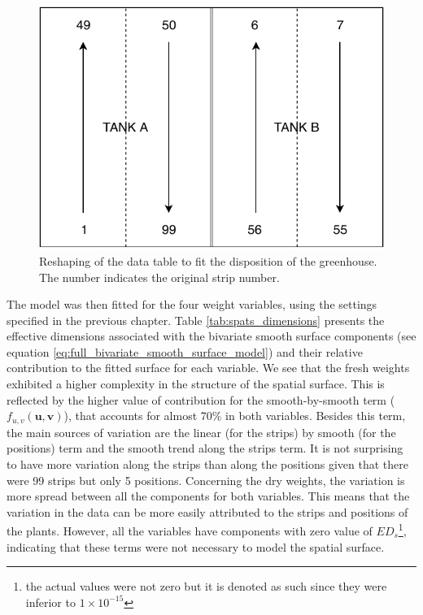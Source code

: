 \begin{figure}[hbtp]
	\centering
	\includegraphics[scale = 0.7]{figures/TANK_repartition.pdf}
	\caption[Reshaping of the data table to fit the disposition of the greenhouse]{Reshaping of the data table to fit the 
	disposition of the greenhouse. The number indicates the original strip number.}
	\label{fig:tank_disposition}	
\end{figure}

The model was then fitted for the four weight variables, using the settings specified in the previous chapter. Table \ref{tab:spats_dimensions} presents the effective dimensions associated with the bivariate smooth surface components (see equation \ref{eq:full_bivariate_smooth_surface_model}) 
and their relative contribution to the fitted surface for each variable.
We see that the fresh weights exhibited a higher complexity in the structure of the spatial surface. This is reflected by the higher value of contribution for the smooth-by-smooth term ($f_{u, v}(\boldsymbol{u}, \boldsymbol{v})$), that accounts for almost 70\% in both variables. Besides this term, the main sources of variation are the linear (for the strips) by smooth (for the positions) term and the smooth trend along the strips term. It is not surprising to have more variation along the strips than along the positions given that there were 99 strips but only 5 positions.
Concerning the dry weights, the variation is more spread between all the components for both variables. This means that the variation in the data can be more easily attributed to the strips and positions of the plants. However, all the variables have components with zero value of $ED_{s}$\footnote{the actual values were not zero but it is denoted as such since they were inferior to $1 \times 10^{-15}$}, indicating that these terms were not necessary to model the spatial surface.\\

